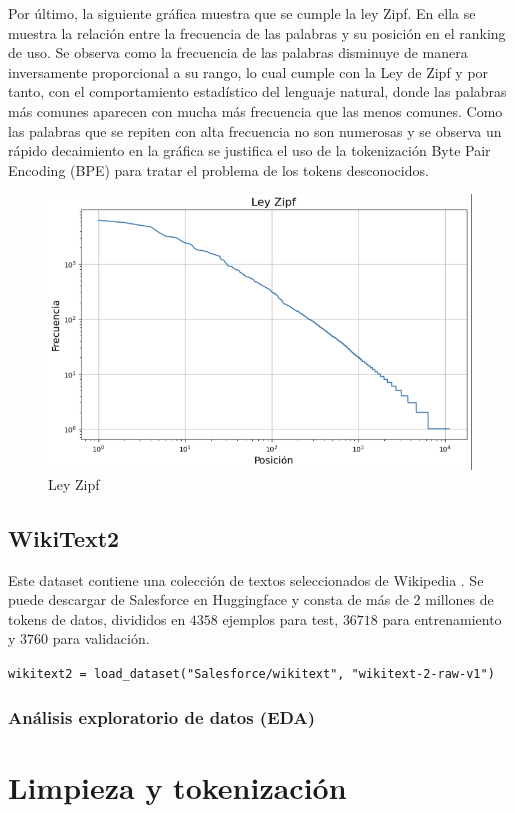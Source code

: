 \documentclass[11pt]{book}
\begin{document}
Por último, la siguiente gráfica muestra que se cumple la ley Zipf. En ella se muestra la relación entre la frecuencia de las palabras y su posición en el ranking de uso. Se observa como la frecuencia de las palabras disminuye de manera inversamente proporcional a su rango, lo cual cumple con la Ley de Zipf y por tanto, con el comportamiento estadístico del lenguaje natural, donde las palabras más comunes aparecen con mucha más frecuencia que las menos comunes. Como las palabras que se repiten con alta frecuencia no son numerosas y se observa un rápido decaimiento en la gráfica se justifica el uso de la tokenización Byte Pair Encoding (BPE) para tratar el problema de los tokens desconocidos.


\begin{figure}[h]
    \centering
    \includegraphics[width=0.5\linewidth]{img/zipf_shake.png}
    \caption{Ley Zipf}
    \label{fig:placeholder37}
\end{figure}

\subsection{WikiText2}
Este dataset contiene una colección de textos seleccionados de Wikipedia \parencite{huggingface_wikitext} \parencite{autonlp2020linkedwikitext}. Se puede descargar de Salesforce en Huggingface y consta de más de 2 millones de tokens de datos, divididos en $4358$ ejemplos para test, $36718$ para entrenamiento y $3760$ para validación. 


\texttt{wikitext2 = load\_dataset("Salesforce/wikitext", "wikitext-2-raw-v1")}

\subsubsection{Análisis exploratorio de datos (EDA)}


\section{Limpieza y tokenización}
\end{document}
